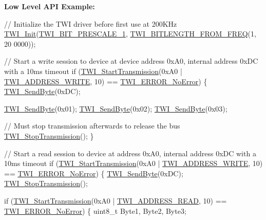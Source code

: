 {\bfseries Low Level A\+PI Example\+:} 
\begin{DoxyCode}
\textcolor{comment}{// Initialize the TWI driver before first use at 200KHz}
\hyperlink{TWI__AVR8_8c_a08e1eb463ce4ec168f2c1cb9b4039cae}{TWI\_Init}(\hyperlink{group__Group__TWI__AVR8_ga66bdf320ad96921bf13c90352bdd5a9a}{TWI\_BIT\_PRESCALE\_1}, \hyperlink{group__Group__TWI__AVR8_ga4761abd051f4daf7da07f886bf6df770}{TWI\_BITLENGTH\_FROM\_FREQ}(1, 20
      0000));

\textcolor{comment}{// Start a write session to device at device address 0xA0, internal address 0xDC with a 10ms timeout}
\textcolor{keywordflow}{if} (\hyperlink{group__Group__TWI__AVR8_ga5e9fac0280a2414490f628071c0073c2}{TWI\_StartTransmission}(0xA0 | \hyperlink{group__Group__TWI__AVR8_gaa2e5a453a4ef4b0c5fe8b96df1c8389f}{TWI\_ADDRESS\_WRITE}, 10) == 
      \hyperlink{group__Group__TWI__AVR8_ggabf76003d83264d2805d52d2149620520a98f4084b31baaaa14fa1b1b0ba9f93c9}{TWI\_ERROR\_NoError})
\{
    \hyperlink{group__Group__TWI__AVR8_ga57d8ffa11749c0ba97d52c2a6e246d65}{TWI\_SendByte}(0xDC);

    \hyperlink{group__Group__TWI__AVR8_ga57d8ffa11749c0ba97d52c2a6e246d65}{TWI\_SendByte}(0x01);
    \hyperlink{group__Group__TWI__AVR8_ga57d8ffa11749c0ba97d52c2a6e246d65}{TWI\_SendByte}(0x02);
    \hyperlink{group__Group__TWI__AVR8_ga57d8ffa11749c0ba97d52c2a6e246d65}{TWI\_SendByte}(0x03);

    \textcolor{comment}{// Must stop transmission afterwards to release the bus}
    \hyperlink{TWI__AVR8_8c_a053f3f8c0c05407d204375de911dcbbb}{TWI\_StopTransmission}();
\}

\textcolor{comment}{// Start a read session to device at address 0xA0, internal address 0xDC with a 10ms timeout}
\textcolor{keywordflow}{if} (\hyperlink{group__Group__TWI__AVR8_ga5e9fac0280a2414490f628071c0073c2}{TWI\_StartTransmission}(0xA0 | \hyperlink{group__Group__TWI__AVR8_gaa2e5a453a4ef4b0c5fe8b96df1c8389f}{TWI\_ADDRESS\_WRITE}, 10) == 
      \hyperlink{group__Group__TWI__AVR8_ggabf76003d83264d2805d52d2149620520a98f4084b31baaaa14fa1b1b0ba9f93c9}{TWI\_ERROR\_NoError})
\{
    \hyperlink{group__Group__TWI__AVR8_ga57d8ffa11749c0ba97d52c2a6e246d65}{TWI\_SendByte}(0xDC);
    \hyperlink{TWI__AVR8_8c_a053f3f8c0c05407d204375de911dcbbb}{TWI\_StopTransmission}();

    \textcolor{keywordflow}{if} (\hyperlink{group__Group__TWI__AVR8_ga5e9fac0280a2414490f628071c0073c2}{TWI\_StartTransmission}(0xA0 | \hyperlink{group__Group__TWI__AVR8_gafdb1cc962976222df2cbc04641721578}{TWI\_ADDRESS\_READ}, 10) == 
      \hyperlink{group__Group__TWI__AVR8_ggabf76003d83264d2805d52d2149620520a98f4084b31baaaa14fa1b1b0ba9f93c9}{TWI\_ERROR\_NoError})
    \{
        uint8\_t Byte1, Byte2, Byte3;


\end{DoxyCode}
